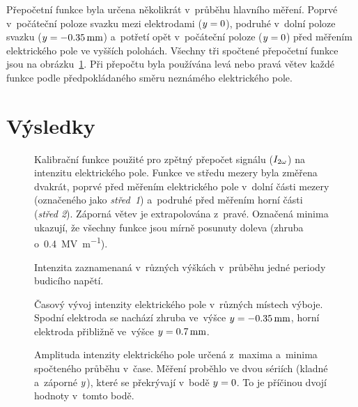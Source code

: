 Přepočetní funkce byla určena několikrát v~průběhu hlavního měření.
Poprvé v~počáteční poloze svazku mezi elektrodami ($y = 0$),
podruhé v~dolní poloze svazku ($y = \SI{-0.35}{\milli\metre}$)
a~potřetí opět v~počáteční poloze ($y = 0$) před měřením elektrického
pole ve vyšších polohách.
Všechny tři spočtené přepočetní funkce jsou
na obrázku~\ref{fig:efish-period-calib}.
Při přepočtu byla používána levá nebo pravá větev každé funkce
podle předpokládaného směru neznámého elektrického pole.

\section{Výsledky}
\label{sec:efish-results}

\begin{figure}
	\centering
	
	\caption{Kalibrační funkce použité pro zpětný přepočet signálu \EFISH{}
		($I_{2\omega}$) na intenzitu elektrického pole.
		Funkce ve středu mezery byla změřena dvakrát, poprvé před měřením
		elektrického pole v~dolní části mezery
		(označeného jako \emph{střed~1})
		a~podruhé před měřením horní části (\emph{střed 2}).
		Záporná větev je extrapolována z~pravé.
		Označená minima ukazují, že všechny funkce jsou mírně posunuty
		doleva (zhruba o~\SI{0.4}{\mega\volt\per\metre}).}
	\label{fig:efish-period-calib}
\end{figure}

\begin{figure}[htp]
	\centering
	
	\caption{Intenzita \EFISH{} zaznamenaná v~různých výškách
		v~průběhu jedné periody budicího napětí.}
	\label{fig:efish-period-efish}
\end{figure}

\begin{figure}[p]
	
	\caption{Časový vývoj intenzity elektrického pole
		v~různých místech výboje.
		Spodní elektroda se nachází zhruba ve~výšce
		$y = \SI{-0.35}{\milli\metre}$,
		horní elektroda přibližně ve~výšce
		$y = \SI{0.7}{\milli\metre}$.}
\end{figure}

\begin{figure}[htp]
	\centering
	
	\caption{Amplituda intenzity elektrického pole určená z~maxima
		a~minima spočteného průběhu v~čase.
		Měření proběhlo ve dvou sériích (kladné a~záporné $y$),
		které se překrývají v~bodě $y = 0$.
		To je příčinou dvojí hodnoty v~tomto bodě.}
	\label{fig:efish-period-amplitude}
\end{figure}

